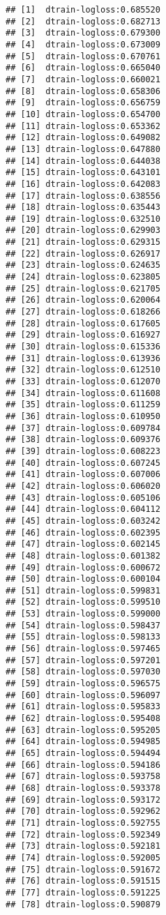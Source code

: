 \documentclass[
]{article}
\begin{document}
\begin{verbatim}
## [1]  dtrain-logloss:0.685520 
## [2]  dtrain-logloss:0.682713 
## [3]  dtrain-logloss:0.679300 
## [4]  dtrain-logloss:0.673009 
## [5]  dtrain-logloss:0.670761 
## [6]  dtrain-logloss:0.665040 
## [7]  dtrain-logloss:0.660021 
## [8]  dtrain-logloss:0.658306 
## [9]  dtrain-logloss:0.656759 
## [10] dtrain-logloss:0.654700 
## [11] dtrain-logloss:0.653362 
## [12] dtrain-logloss:0.649082 
## [13] dtrain-logloss:0.647880 
## [14] dtrain-logloss:0.644038 
## [15] dtrain-logloss:0.643101 
## [16] dtrain-logloss:0.642083 
## [17] dtrain-logloss:0.638556 
## [18] dtrain-logloss:0.635443 
## [19] dtrain-logloss:0.632510 
## [20] dtrain-logloss:0.629903 
## [21] dtrain-logloss:0.629315 
## [22] dtrain-logloss:0.626917 
## [23] dtrain-logloss:0.624635 
## [24] dtrain-logloss:0.623805 
## [25] dtrain-logloss:0.621705 
## [26] dtrain-logloss:0.620064 
## [27] dtrain-logloss:0.618266 
## [28] dtrain-logloss:0.617605 
## [29] dtrain-logloss:0.616927 
## [30] dtrain-logloss:0.615336 
## [31] dtrain-logloss:0.613936 
## [32] dtrain-logloss:0.612510 
## [33] dtrain-logloss:0.612070 
## [34] dtrain-logloss:0.611608 
## [35] dtrain-logloss:0.611259 
## [36] dtrain-logloss:0.610950 
## [37] dtrain-logloss:0.609784 
## [38] dtrain-logloss:0.609376 
## [39] dtrain-logloss:0.608223 
## [40] dtrain-logloss:0.607245 
## [41] dtrain-logloss:0.607006 
## [42] dtrain-logloss:0.606020 
## [43] dtrain-logloss:0.605106 
## [44] dtrain-logloss:0.604112 
## [45] dtrain-logloss:0.603242 
## [46] dtrain-logloss:0.602395 
## [47] dtrain-logloss:0.602145 
## [48] dtrain-logloss:0.601382 
## [49] dtrain-logloss:0.600672 
## [50] dtrain-logloss:0.600104 
## [51] dtrain-logloss:0.599831 
## [52] dtrain-logloss:0.599510 
## [53] dtrain-logloss:0.599000 
## [54] dtrain-logloss:0.598437 
## [55] dtrain-logloss:0.598133 
## [56] dtrain-logloss:0.597465 
## [57] dtrain-logloss:0.597201 
## [58] dtrain-logloss:0.597030 
## [59] dtrain-logloss:0.596575 
## [60] dtrain-logloss:0.596097 
## [61] dtrain-logloss:0.595833 
## [62] dtrain-logloss:0.595408 
## [63] dtrain-logloss:0.595205 
## [64] dtrain-logloss:0.594985 
## [65] dtrain-logloss:0.594494 
## [66] dtrain-logloss:0.594186 
## [67] dtrain-logloss:0.593758 
## [68] dtrain-logloss:0.593378 
## [69] dtrain-logloss:0.593172 
## [70] dtrain-logloss:0.592962 
## [71] dtrain-logloss:0.592755 
## [72] dtrain-logloss:0.592349 
## [73] dtrain-logloss:0.592181 
## [74] dtrain-logloss:0.592005 
## [75] dtrain-logloss:0.591672 
## [76] dtrain-logloss:0.591515 
## [77] dtrain-logloss:0.591225 
## [78] dtrain-logloss:0.590879 

\end{verbatim}
\end{document}
